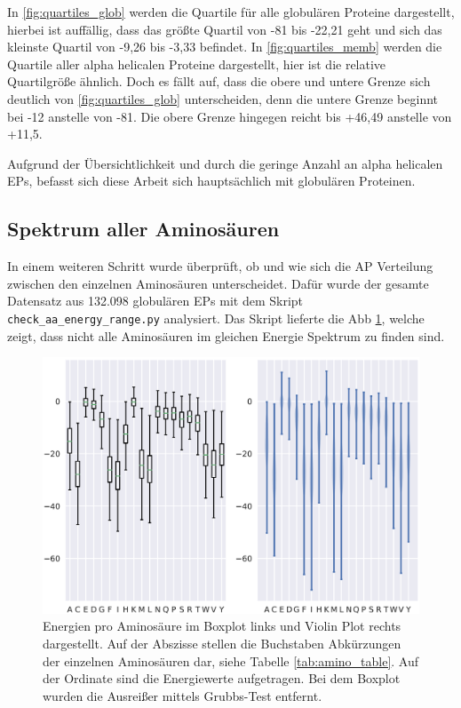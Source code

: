 
In \ref{fig:quartiles_glob} werden die Quartile für alle globulären Proteine dargestellt, hierbei ist auffällig, dass das größte Quartil von -81 bis -22,21 geht und sich das kleinste Quartil von -9,26 bis -3,33 befindet. In \ref{fig:quartiles_memb} werden die Quartile aller alpha helicalen Proteine dargestellt, hier ist die relative Quartilgröße ähnlich. Doch es fällt auf, dass die obere und untere Grenze sich deutlich von \ref{fig:quartiles_glob} unterscheiden, denn die untere Grenze beginnt bei -12 anstelle von -81. Die obere Grenze hingegen reicht bis +46,49 anstelle von +11,5.

Aufgrund der Übersichtlichkeit und durch die geringe Anzahl an alpha helicalen \ac{EP}s, befasst sich diese Arbeit sich hauptsächlich mit globulären Proteinen.


\subsection{Spektrum aller Aminosäuren}
In einem weiteren Schritt wurde überprüft, ob und wie sich die \ac{AP} Verteilung zwischen den einzelnen Aminosäuren unterscheidet. Dafür wurde der gesamte Datensatz aus 132.098 globulären \ac{EP}s mit dem Skript \texttt{check\_aa\_energy\_range.py} analysiert. Das Skript lieferte die \ac{Abb} \ref{fig:energy_ranges}, welche zeigt, dass nicht alle Aminosäuren im gleichen Energie Spektrum zu finden sind. 


\begin{figure}
    \centering
    \includegraphics[width=.99\textwidth]{images/BoxPlot_energy_rages.png}
    \caption{Energien pro Aminosäure im Boxplot links und Violin Plot rechts dargestellt. Auf der Abszisse stellen die Buchstaben Abkürzungen der einzelnen Aminosäuren dar, siehe Tabelle \ref{tab:amino_table}. Auf der Ordinate sind die Energiewerte aufgetragen. Bei dem Boxplot wurden die Ausreißer mittels Grubbs-Test entfernt.}
    \label{fig:energy_ranges}
\end{figure}

